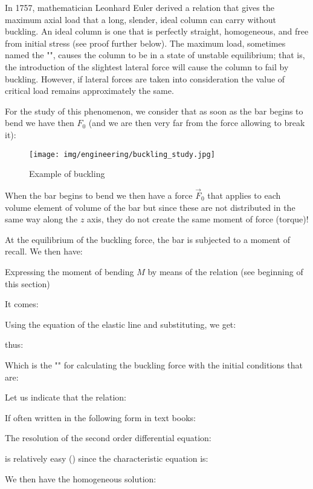 	In 1757, mathematician Leonhard Euler derived a relation that gives the maximum axial load that a long, slender, ideal column can carry without buckling. An ideal column is one that is perfectly straight, homogeneous, and free from initial stress (see proof further below). The maximum load, sometimes named the "", causes the column to be in a state of unstable equilibrium; that is, the introduction of the slightest lateral force will cause the column to fail by buckling. However, if lateral forces are taken into consideration the value of critical load remains approximately the same.

	For the study of this phenomenon, we consider that as soon as the bar begins to bend we have then $F_0$ (and we are then very far from the force allowing to break it):
	\begin{figure}[H]
		\centering
		\texttt{[image: img/engineering/buckling\_study.jpg]}
		\caption{Example of buckling}
	\end{figure}
	When the bar begins to bend we then have a force $\vec{F}_0$ that applies to each volume element of volume of the bar but since these are not distributed in the same way along the $z$ axis, they do not create the same moment of force (torque)!

	At the equilibrium of the buckling force, the bar is subjected to a moment of recall. We then have:
	
	Expressing the moment of bending $M$ by means of the relation (see beginning of this section)
	
	It comes:
	
	Using the equation of the elastic line and substituting, we get:	
	
	thus:
	
	Which is the "" for calculating the buckling force with the initial conditions that are:
	
	Let us indicate that the relation:
	
	If often written in the following form in text books:
	
	The resolution of the second order differential equation:
	
	is relatively easy () since the characteristic equation is:
	
	We then have the homogeneous solution:
	
